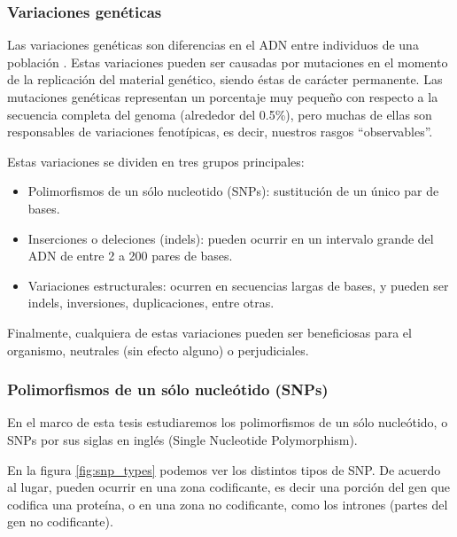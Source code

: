\clearpage

\subsubsection{Variaciones genéticas}

Las variaciones genéticas son diferencias en el ADN entre individuos de una población \cite{EMBL}. Estas variaciones pueden ser causadas por mutaciones en el momento de la replicación del material genético, siendo éstas de carácter permanente. Las mutaciones genéticas representan un porcentaje muy pequeño con respecto a la secuencia completa del genoma (alrededor del 0.5\%), pero muchas de ellas son responsables de variaciones fenotípicas, es decir, nuestros rasgos ``observables''. 

Estas variaciones se dividen en tres grupos principales:

\begin{itemize}
    \item Polimorfismos de un sólo nucleotido (SNPs): sustitución de un único par de bases. 
    \item Inserciones o deleciones (indels): pueden ocurrir en un intervalo grande del ADN de entre 2 a 200 pares de bases.
    \item Variaciones estructurales: ocurren en secuencias largas de bases, y pueden ser indels, inversiones, duplicaciones, entre otras.
    
\end{itemize}

Finalmente, cualquiera de estas variaciones pueden ser beneficiosas para el organismo, neutrales (sin efecto alguno) o perjudiciales. 

\subsubsection{Polimorfismos de un sólo nucleótido (SNPs)}

En el marco de esta tesis estudiaremos los polimorfismos de un sólo nucleótido, o SNPs por sus siglas en inglés (Single Nucleotide Polymorphism). 

En la figura \ref{fig:snp_types} podemos ver los distintos tipos de SNP. De acuerdo al lugar, pueden ocurrir en una zona codificante, es decir una porción del gen que codifica una proteína, o en una zona no codificante, como los intrones (partes del gen no codificante).

